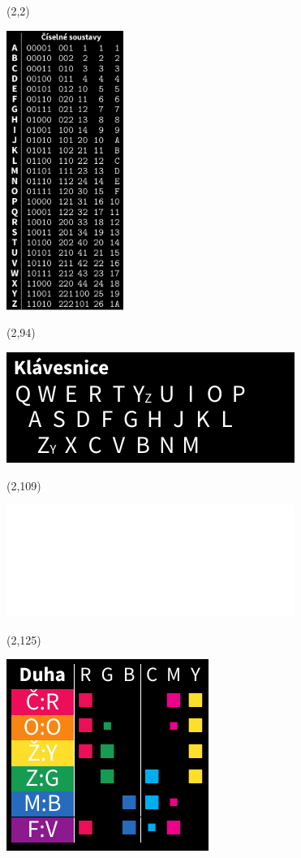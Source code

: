 \documentclass{extarticle}
\begin{document}
\pagecolor{black}
\pagestyle{empty}

\begin{textblock}{38}(2,2)
\vfill
{\centerline{\includegraphics[width=38mm]{tools/numbers-table-v3.pdf}}} 
\vfill
\end{textblock}


\begin{textblock}{38}(2,94)
\vfill
{\centerline{\includegraphics[scale=0.6333]{tools/keyboard-v2.pdf}}} 
\vfill
\end{textblock}

\begin{textblock}{38}(2,109)
\vfill
{\centerline{\includegraphics[scale=0.6333]{tools/rosicrucian-polish.pdf}}} 
\vfill
\end{textblock}

\begin{textblock}{26.6}(2,125)
\vfill
{\centerline{\includegraphics[scale=0.6333]{tools/rainbow-v2.pdf}}} 
\vfill
\end{textblock}
\end{document}
